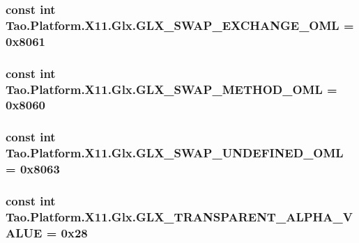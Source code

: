 \label{class_tao_1_1_platform_1_1_x11_1_1_glx_a70d4f7954350861ad0d71ed03e300b33}
\hypertarget{class_tao_1_1_platform_1_1_x11_1_1_glx_a7867fdb981fbefbb0f4cc4ec47d5451b}{
\subsubsection[{GLX\_\-SWAP\_\-EXCHANGE\_\-OML}]{\setlength{\rightskip}{0pt plus 5cm}const int {\bf Tao.Platform.X11.Glx.GLX\_\-SWAP\_\-EXCHANGE\_\-OML} = 0x8061}}
\label{class_tao_1_1_platform_1_1_x11_1_1_glx_a7867fdb981fbefbb0f4cc4ec47d5451b}
\hypertarget{class_tao_1_1_platform_1_1_x11_1_1_glx_aa3a152fce38aec49cf836f6cea9ad5d6}{
\subsubsection[{GLX\_\-SWAP\_\-METHOD\_\-OML}]{\setlength{\rightskip}{0pt plus 5cm}const int {\bf Tao.Platform.X11.Glx.GLX\_\-SWAP\_\-METHOD\_\-OML} = 0x8060}}
\label{class_tao_1_1_platform_1_1_x11_1_1_glx_aa3a152fce38aec49cf836f6cea9ad5d6}
\hypertarget{class_tao_1_1_platform_1_1_x11_1_1_glx_ac0b3ee6aa931dd05a099b72bd433d664}{
\subsubsection[{GLX\_\-SWAP\_\-UNDEFINED\_\-OML}]{\setlength{\rightskip}{0pt plus 5cm}const int {\bf Tao.Platform.X11.Glx.GLX\_\-SWAP\_\-UNDEFINED\_\-OML} = 0x8063}}
\label{class_tao_1_1_platform_1_1_x11_1_1_glx_ac0b3ee6aa931dd05a099b72bd433d664}
\hypertarget{class_tao_1_1_platform_1_1_x11_1_1_glx_af7cef16f92ad62258a38868572d21ae3}{
\subsubsection[{GLX\_\-TRANSPARENT\_\-ALPHA\_\-VALUE}]{\setlength{\rightskip}{0pt plus 5cm}const int {\bf Tao.Platform.X11.Glx.GLX\_\-TRANSPARENT\_\-ALPHA\_\-VALUE} = 0x28}}
